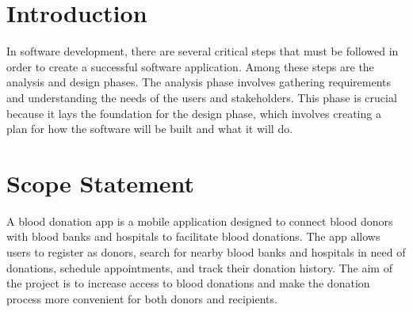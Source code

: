 
\section{Introduction}
In software development, there are several critical steps that must be followed in order to create a successful software application. Among these steps are the analysis and design phases. The analysis phase involves gathering requirements and understanding the needs of the users and stakeholders. This phase is crucial because it lays the foundation for the design phase, which involves creating a plan for how the software will be built and what it will do.



\section{Scope Statement}
A blood donation app is a mobile application designed to connect blood donors with blood banks and hospitals to facilitate blood donations. The app allows users to register as donors, search for nearby blood banks and hospitals in need of donations, schedule appointments, and track their donation history. The aim of the project is to increase access to blood donations and make the donation process more convenient for both donors and recipients.

